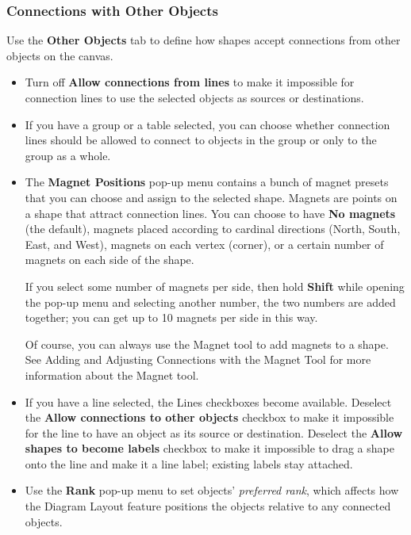 \documentclass[../main.tex]{subfiles}
\begin{document}
\subsubsection{Connections with Other Objects}

Use the \textbf{Other Objects} tab to define how shapes accept connections from other objects on
the canvas.


\begin{itemize}
  \item Turn off \textbf{Allow connections from lines} to make it impossible for connection
    lines to use the selected objects as sources or destinations.
  \item If you have a group or a table selected, you can choose whether connection lines should
    be allowed to connect to objects in the group or only to the group as a whole.
  \item The \textbf{Magnet Positions} pop-up menu contains a bunch of magnet presets that you
    can choose and assign to the selected shape. Magnets are points on a shape that attract
    connection lines. You can choose to have \textbf{No magnets} (the default), magnets placed
    according to cardinal directions (North, South, East, and West), magnets on each vertex
    (corner), or a certain number of magnets on each side of the shape.

    If you select some number of magnets per side, then hold \textbf{Shift} while opening the
    pop-up menu and selecting another number, the two numbers are added together; you can get up
    to 10 magnets per side in this way.

    \begin{ogtip}
      Of course, you can always use the Magnet tool to add magnets to a shape. See Adding and
      Adjusting Connections with the Magnet Tool for more information about the Magnet tool.
    \end{ogtip}
  \item If you have a line selected, the Lines checkboxes become available. Deselect the
    \textbf{Allow connections to other objects} checkbox to make it impossible for the line to
    have an object as its source or destination. Deselect the \textbf{Allow shapes to become
    labels} checkbox to make it impossible to drag a shape onto the line and make it a line
    label; existing labels stay attached.
  \item Use the \textbf{Rank} pop-up menu to set objects' \textit{preferred rank}, which affects
    how the Diagram Layout feature positions the objects relative to any connected objects.


\end{itemize}
\end{document}
